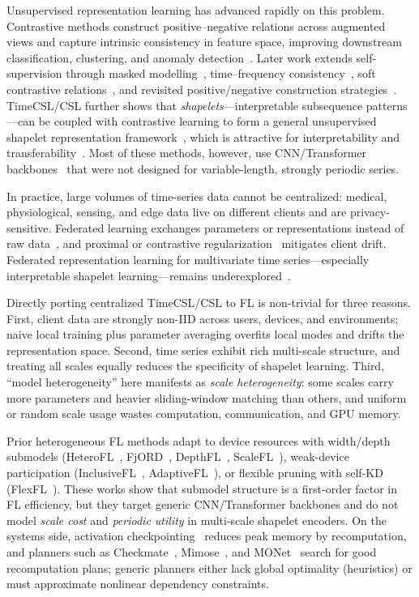 \documentclass[sigconf]{acmart}
\begin{document}
Unsupervised representation learning has advanced rapidly on this problem.
Contrastive methods construct positive--negative relations across augmented
views and capture intrinsic consistency in feature space, improving downstream
classification, clustering, and anomaly detection~\cite{ts2vec,tstcc,tfc}.
Later work extends self-supervision through masked modelling~\cite{simmtm},
time--frequency consistency~\cite{tfc}, soft contrastive
relations~\cite{softclt}, and revisited positive/negative construction
strategies~\cite{timesurl}. TimeCSL/CSL further shows that
\emph{shapelets}---interpretable subsequence patterns---can be coupled with
contrastive learning to form a general unsupervised shapelet representation
framework~\cite{timescsl}, which is attractive for interpretability and
transferability~\cite{interpgn,unishape}. Most of these methods, however, use
CNN/Transformer backbones~\cite{fcnbaseline,timesnet} that were not designed for
variable-length, strongly periodic series.

In practice, large volumes of time-series data cannot be centralized: medical,
physiological, sensing, and edge data live on different clients and are
privacy-sensitive. Federated learning exchanges parameters or representations
instead of raw data~\cite{fedavg}, and proximal or contrastive
regularization~\cite{fedprox,moon} mitigates client drift. Federated
representation learning for multivariate time series---especially interpretable
shapelet learning---remains underexplored~\cite{fedst,fedtsc}.

Directly porting centralized TimeCSL/CSL to FL is non-trivial for three reasons.
First, client data are strongly non-IID across users, devices, and environments;
naive local training plus parameter averaging overfits local modes and drifts the
representation space. Second, time series exhibit rich multi-scale structure, and
treating all scales equally reduces the specificity of shapelet learning. Third,
``model heterogeneity'' here manifests as \emph{scale heterogeneity}: some scales
carry more parameters and heavier sliding-window matching than others, and
uniform or random scale usage wastes computation, communication, and GPU memory.

Prior heterogeneous FL methods adapt to device resources with width/depth
submodels (HeteroFL~\cite{heterofl}, FjORD~\cite{fjord}, DepthFL~\cite{depthfl},
ScaleFL~\cite{scalefl}), weak-device participation
(InclusiveFL~\cite{inclusivefl}, AdaptiveFL~\cite{adaptivefl}), or flexible
pruning with self-KD (FlexFL~\cite{flexfl}). These works show that submodel
structure is a first-order factor in FL efficiency, but they target generic
CNN/Transformer backbones and do not model \emph{scale cost} and \emph{periodic
utility} in multi-scale shapelet encoders. On the systems side, activation
checkpointing~\cite{chen2016checkpoint} reduces peak memory by recomputation, and
planners such as Checkmate~\cite{checkmate}, Mimose~\cite{mimose}, and
MONet~\cite{monet} search for good recomputation plans; generic planners either
lack global optimality (heuristics) or must approximate nonlinear dependency
constraints.
\end{document}
